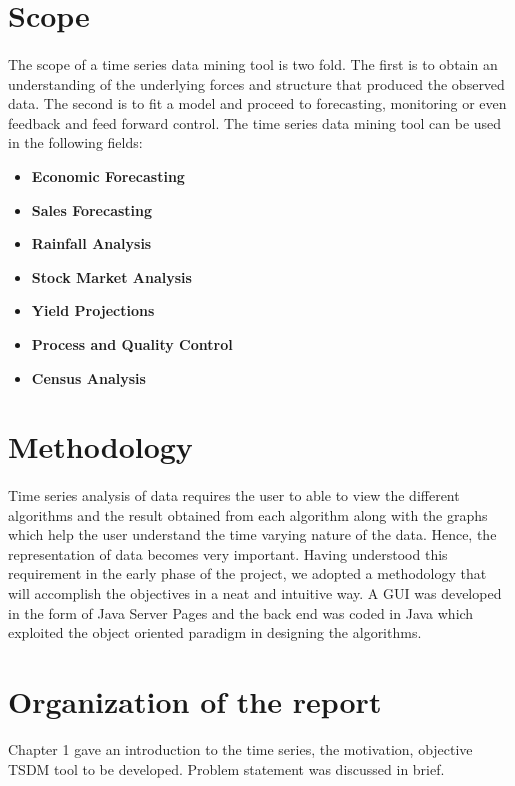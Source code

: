 \documentclass[12pt,a4paper]{report}
\begin{document}
\section{Scope}
\paragraph{} The scope of a time series data mining tool is two fold. The first  is to obtain an understanding of the underlying forces and structure that produced the observed data. The second is to 
fit a model and proceed to forecasting, monitoring or even feedback and feed forward control. The time series data mining tool can be used in the following fields: 
\begin{itemize}
\item{\textbf{Economic Forecasting}}
\item{\textbf{Sales Forecasting}}
\item{\textbf{Rainfall Analysis}}
\item{\textbf{Stock Market Analysis}}
\item{\textbf{Yield Projections}}
\item{\textbf{Process and Quality Control}}
\item{\textbf{Census Analysis}}
\end{itemize}
\section{Methodology}
\paragraph{} Time series analysis of data requires the user to able to view the different algorithms and the result obtained from each algorithm along with the graphs which help the user understand the time varying nature of the data. Hence, the representation of data becomes very important. Having understood this requirement in the early phase of the project, we adopted a methodology that will accomplish the objectives in a neat and intuitive way. A GUI was developed in the form of Java Server Pages and the back end was coded in Java which exploited the object oriented paradigm in designing the algorithms. 

\section{Organization of the report}
Chapter 1 gave an introduction to the time series, the motivation, objective TSDM tool to be developed. Problem statement was discussed in brief.
\end{document}
